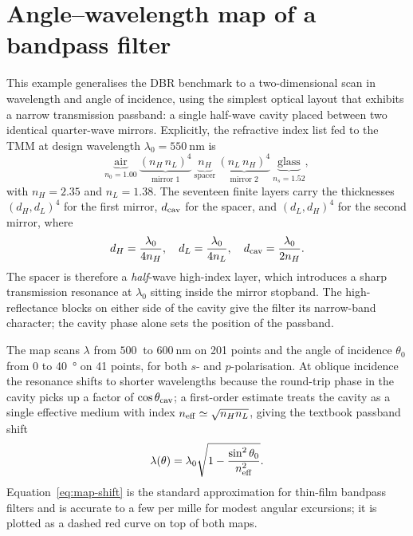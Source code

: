 \section{Angle--wavelength map of a bandpass filter}

This example generalises the DBR benchmark to a two-dimensional scan in
wavelength and angle of incidence, using the simplest optical layout that
exhibits a narrow transmission passband: a single half-wave cavity placed
between two identical quarter-wave mirrors. Explicitly, the refractive
index list fed to the TMM at design wavelength
$\lambda_0 = \SI{550}{\nano\metre}$ is
\[
  \underbrace{\text{air}}_{n_0=1.00}\
  \underbrace{(n_H\,n_L)^{4}}_{\text{mirror 1}}\
  \underbrace{n_H}_{\text{spacer}}\
  \underbrace{(n_L\,n_H)^{4}}_{\text{mirror 2}}\
  \underbrace{\text{glass}}_{n_s = 1.52},
\]
with $n_H = 2.35$ and $n_L = 1.38$. The seventeen finite layers carry the
thicknesses $(d_H, d_L)^{4}$ for the first mirror, $d_{\rm cav}$ for the
spacer, and $(d_L, d_H)^{4}$ for the second mirror, where
\begin{equation}
  d_H = \frac{\lambda_0}{4 n_H},\quad d_L = \frac{\lambda_0}{4 n_L},\quad d_{\rm cav} = \frac{\lambda_0}{2 n_H}. \label{eq:map-thick}
\end{equation}
The spacer is therefore a \emph{half}-wave high-index layer, which
introduces a sharp transmission resonance at $\lambda_0$ sitting inside
the mirror stopband. The high-reflectance blocks on either side of the
cavity give the filter its narrow-band character; the cavity phase alone
sets the position of the passband.

The map scans $\lambda$ from $\SI{500}{}$ to $\SI{600}{\nano\metre}$ on
201 points and the angle of incidence $\theta_0$ from $0$ to
\SI{40}{\degree} on 41 points, for both $s$- and $p$-polarisation. At
oblique incidence the resonance shifts to shorter wavelengths because the
round-trip phase in the cavity picks up a factor of $\cos\theta_{\rm cav}$;
a first-order estimate treats the cavity as a single effective medium with
index $n_{\rm eff} \simeq \sqrt{n_H n_L}$, giving the textbook passband
shift
\begin{equation}
  \lambda(\theta) = \lambda_0\sqrt{1 - \frac{\sin^{2}\theta_0}{n_{\rm eff}^{2}}}. \label{eq:map-shift}
\end{equation}
Equation~\eqref{eq:map-shift} is the standard approximation for thin-film
bandpass filters and is accurate to a few per mille for modest angular
excursions; it is plotted as a dashed red curve on top of both maps.

